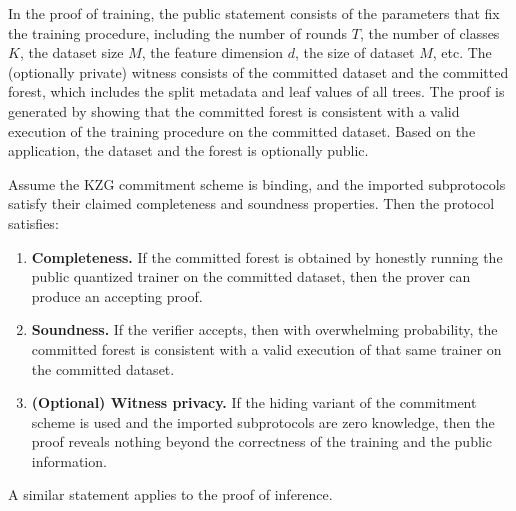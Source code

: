 In the proof of training, the public statement consists of the parameters
that fix the training procedure,
including the number of rounds $T$, the number of classes $K$, the dataset size $M$, the feature dimension $d$, 
the size of dataset $M$, etc.
The (optionally private) witness consists of the committed dataset and the committed forest,
which includes the split metadata and leaf values of all trees.
The proof is generated by showing that the committed forest is 
consistent with a valid execution of the training procedure on the committed dataset.
Based on the application,
the dataset and the forest is optionally public.

\begin{theorem}
\label{thm:main-informal}
Assume the KZG commitment scheme is binding, and the imported subprotocols satisfy
their claimed completeness and soundness properties. Then the protocol satisfies:
\begin{enumerate}
    \item \textbf{Completeness.} If the committed forest is obtained by honestly
    running the public quantized trainer on the committed dataset, then the
    prover can produce an accepting proof.

    \item \textbf{Soundness.} If the verifier accepts, then
    with overwhelming probability,
    the committed forest is consistent with a valid execution of that
    same trainer on the committed dataset.

    \item \textbf{(Optional) Witness privacy.} If the hiding variant of the commitment
    scheme is used and the imported subprotocols are zero knowledge, then the
    proof reveals nothing beyond the correctness
    of the training and the public information.
\end{enumerate}
\end{theorem}

A similar statement applies to the proof of inference.

